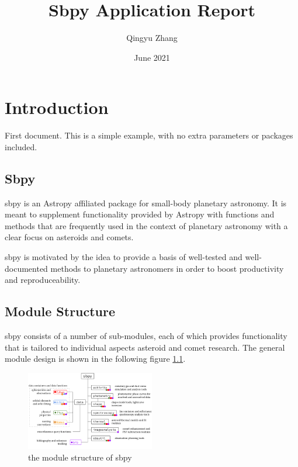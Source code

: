 \documentclass{report}
\begin{document}
\title{Sbpy Application Report}
\author{Qingyu Zhang}
\date{June 2021}
\maketitle

\tableofcontents


\chapter{Introduction}

First document. This is a simple example, with no
extra parameters or packages included.

\section{Sbpy}

sbpy is an Astropy affiliated package for small-body planetary astronomy. It is meant to supplement functionality provided by Astropy with functions and methods that are frequently used in the context of planetary astronomy with a clear focus on asteroids and comets\cite{Mommert2019}.

sbpy is motivated by the idea to provide a basis of well-tested and well-documented methods to planetary astronomers in order to boost productivity and reproduceability\cite{Mommert2019}.

\section{Module Structure}
sbpy consists of a number of sub-modules, each of which provides functionality that is tailored to individual aspects asteroid and comet research. The general module design is shown in the following figure \ref{fig:structure}.

\begin{figure}[htb]
    \centering
    \includegraphics[width=0.5\textwidth]{structure}
    \caption{the module structure of sbpy}
    \label{fig:structure}
\end{figure}
\end{document}
